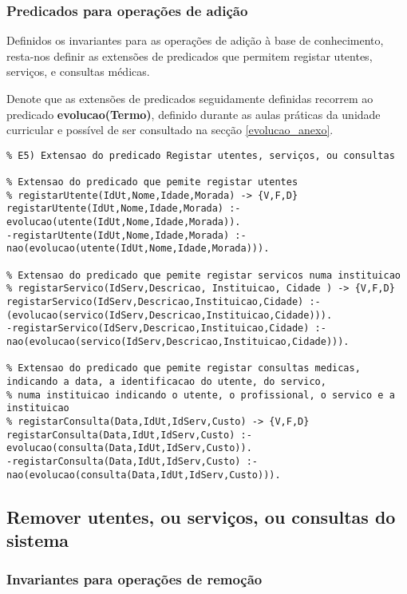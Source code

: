 \documentclass[
  oneside,
  10pt, a4paper,
  footinclude=true,
  headinclude=true,
  cleardoublepage=empty
]{scrbook}
\begin{document}
\begin{itemize}
\end{itemize}
\subsubsection{Predicados para operações de adição}
Definidos os invariantes para as operações de adição à base de conhecimento, resta-nos definir as extensões de predicados que permitem registar utentes, serviços, e consultas médicas.\par
Denote que as extensões de predicados seguidamente definidas recorrem ao predicado \textbf{evolucao(Termo)}, definido durante as aulas práticas da unidade curricular e possível de ser consultado na secção \ref{evolucao_anexo}.

\begin{lstlisting}
% E5) Extensao do predicado Registar utentes, serviços, ou consultas

% Extensao do predicado que pemite registar utentes
% registarUtente(IdUt,Nome,Idade,Morada) -> {V,F,D}
registarUtente(IdUt,Nome,Idade,Morada) :- evolucao(utente(IdUt,Nome,Idade,Morada)).
-registarUtente(IdUt,Nome,Idade,Morada) :- nao(evolucao(utente(IdUt,Nome,Idade,Morada))).

% Extensao do predicado que pemite registar servicos numa instituicao
% registarServico(IdServ,Descricao, Instituicao, Cidade ) -> {V,F,D}
registarServico(IdServ,Descricao,Instituicao,Cidade) :- (evolucao(servico(IdServ,Descricao,Instituicao,Cidade))).
-registarServico(IdServ,Descricao,Instituicao,Cidade) :- nao(evolucao(servico(IdServ,Descricao,Instituicao,Cidade))).

% Extensao do predicado que pemite registar consultas medicas, indicando a data, a identificacao do utente, do servico,
% numa instituicao indicando o utente, o profissional, o servico e a instituicao
% registarConsulta(Data,IdUt,IdServ,Custo) -> {V,F,D}
registarConsulta(Data,IdUt,IdServ,Custo) :- evolucao(consulta(Data,IdUt,IdServ,Custo)).
-registarConsulta(Data,IdUt,IdServ,Custo) :- nao(evolucao(consulta(Data,IdUt,IdServ,Custo))).
\end{lstlisting}


\subsection{Remover utentes, ou serviços, ou consultas do sistema}
\label{remocao}

\subsubsection{Invariantes para operações de remoção}
\label{invariantes_remocao}
\end{document}
